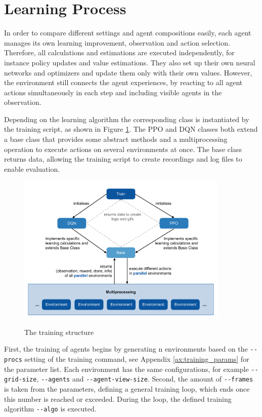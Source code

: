 \section{Learning Process}\label{learning_process}
In order to compare different settings and agent compositions easily, each agent manages its own learning improvement, observation and action selection. Therefore, all calculations and estimations are executed independently, for instance policy updates and value estimations. They also set up their own neural networks and optimizers and update them only with their own values. However, the environment still connects the agent experiences, by reacting to all agent actions simultaneously in each step and including visible agents in the observation.

Depending on the learning algorithm the corresponding class is instantiated by the training script, as shown in Figure \ref{fig:training}. The PPO and DQN classes both extend a base class that provides some abstract methods and a multiprocessing operation to execute actions on several environments at once. The base class returns data, allowing the training script to create recordings and log files to enable evaluation.

\begin{figure}[hpbt]
    \centering
    \includegraphics[width=0.9\textwidth]{pictures/training}\\
    \caption[The Training Structure]{The training structure}\label{fig:training}
\end{figure}

First, the training of agents begins by generating n environments based on the \verb|--procs| setting of the training command, see Appendix \ref{ax:training_params} for the parameter list. Each environment has the same configurations, for example \verb|--grid-size|, \verb|--agents| and \verb|--agent-view-size|. Second, the amount of \verb|--frames| is taken from the parameters, defining a general training loop, which ends once this number is reached or exceeded. During the loop, the defined training algorithm \verb|--algo| is executed.

